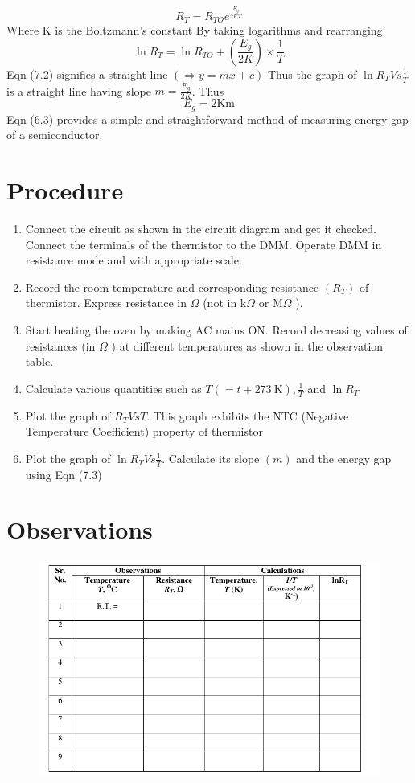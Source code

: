 \documentclass[12pt]{article}
\begin{document}
$$
R_{T}=R_{T O} e^{\frac{E_{g}}{2 K T}}
$$
Where $\mathrm{K}$ is the Boltzmann's constant
By taking logarithms and rearranging
$$
\ln R_{T}=\ln R_{T O}+\left(\frac{E_{g}}{2 K}\right) \times \frac{1}{T}
$$
Eqn (7.2) signifies a straight line $(\Rightarrow y=m x+c)$ Thus the graph of $\ln R_{T} V s \frac{1}{T}$ is a straight line having slope $m=\frac{E_{g}}{2 K}$. Thus
$$
E_{g}=2 \mathrm{Km}
$$
Eqn (6.3) provides a simple and straightforward method of measuring energy gap of a semiconductor.



\section{Procedure}
\begin{enumerate}
	 
	\item Connect the circuit as shown in the circuit diagram and get it checked. Connect the terminals of the thermistor to the DMM. Operate DMM in resistance mode and with appropriate scale.
	\item Record the room temperature and corresponding resistance $\left(R_{T}\right)$ of thermistor. Express resistance in $\Omega$ (not in $\mathrm{k} \Omega$ or $\mathrm{M} \Omega$ ).
	\item Start heating the oven by making $\mathrm{AC}$ mains $\mathrm{ON}$. Record decreasing values of resistances (in $\Omega$ ) at different temperatures as shown in the observation table.
	\item Calculate various quantities such as $T(=t+273 \mathrm{~K}), \frac{1}{T}$ and $\ln R_{T}$
	\item Plot the graph of $R_{T} V s T$. This graph exhibits the NTC (Negative Temperature Coefficient) property of thermistor
	\item Plot the graph of $\ln R_{T} V s \frac{1}{T}$. Calculate its slope $(m)$ and the energy gap using Eqn (7.3)
\end{enumerate}

\section{Observations}

\begin{figure}[H]
	\centering
	\includegraphics[scale=0.7]{table.png}
	\label{it}
\end{figure}
\end{document}
